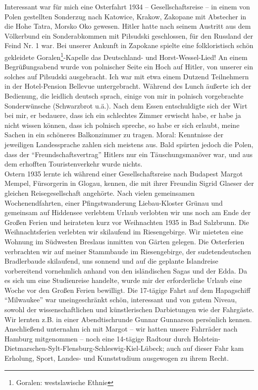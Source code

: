 Interessant war für mich eine Osterfahrt 1934 -- Gesellschaftsreise -- in einem von Polen gestellten Sonderzug nach Katowice, Krakow, Zakopane mit Abstecher in die Hohe Tatra, Morsko Oko gewesen. Hitler hatte nach seinem Austritt aus dem Völkerbund ein Sonderabkommen mit Piłsudski geschlossen, für den Russland der Feind Nr. 1 war. Bei unserer Ankunft in Zapokane spielte eine folkloristisch schön gekleidete Goralen\footnote{Goralen: westslawische Ethnie}-Kapelle das Deutschland- und Horst-Wessel-Lied! An einem Begrüßungsabend wurde von polnischer Seite ein Hoch auf Hitler, von unserer ein solches auf Piłsudski ausgebracht. Ich war mit etwa einem Dutzend Teilnehmern in der Hotel-Pension Bellevue untergebracht. Während des Lunch äußerte ich der Bedienung, die leidlich deutsch sprach, einige von mir in polnisch vorgebrachte Sonderwünsche (Schwarzbrot u.ä.). Nach dem Essen entschuldigte sich der Wirt bei mir, er bedauere, dass ich ein schlechtes Zimmer erwischt habe, er habe ja nicht wissen können, dass ich polnisch spreche, so habe er sich erlaubt, meine Sachen in ein schöneres Balkonzimmer zu tragen. Moral: Kenntnisse der jeweiligen Landessprache zahlen sich meistens aus. Bald spürten jedoch die Polen, dass der \enquote{Freundschaftsvertrag} Hitlers nur ein Täuschungsmanöver war, und aus dem erhofften Touristenverkehr wurde nichts.\\

Ostern 1935 lernte ich während einer Gesellschaftsreise nach Budapest Margot Mempel, Fürsorgerin in Glogau, kennen, die mit ihrer Freundin Sigrid Glaeser der gleichen Reisegesellschaft angehörte. Nach vielen gemeinsamen Wochenendfahrten, einer Pfingstwanderung Liebau-Kloster Grünau und gemeinsam auf Hiddensee verlebtem Urlaub verlobten wir uns noch am Ende der Großen Ferien und heirateten kurz vor Weihnachten 1935 in Bad Salzbrunn. Die Weihnachtsferien verlebten wir skilaufend im Riesengebirge. Wir mieteten eine Wohnung im Südwesten Breslaus inmitten von Gärten gelegen. Die Osterferien verbrachten wir auf meiner Stammbaude im Riesengebirge, der sudetendeutschen Bradlerbaude skilaufend, uns sonnend und auf die geplante Islandreise vorbereitend vornehmlich anhand von den isländischen Sagas und der Edda. Da es sich um eine Studienreise handelte, wurde mir der erforderliche Urlaub eine Woche vor den Großen Ferien bewilligt. Die 17-tägige Fahrt auf dem Hapagschiff \enquote{Milwaukee} war uneingeschränkt schön, interessant und von gutem Niveau, sowohl der wissenschaftlichen und künstlerischen Darbietungen wie der Fahrgäste. Wir lernten z.B. in einer Abendtischrunde Gunnar Gunnarson persönlich kennen.  Anschließend unternahm ich mit Margot -- wir hatten unsere Fahrräder nach Hamburg mitgenommen -- noch eine 14-tägige Radtour durch Holstein-Dietmarschen-Sylt-Flensburg-Schleswig-Kiel-Lübeck; auch auf dieser Fahr kam Erholung, Sport, Landes- und Kunststudium ausgewogen zu ihrem Recht.

